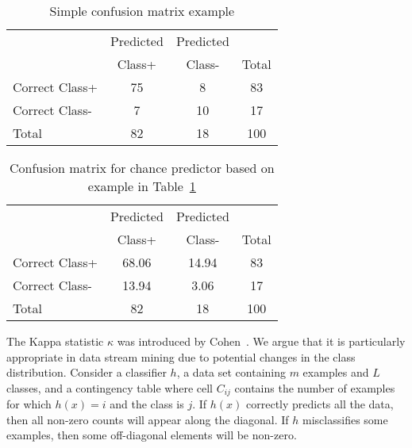 
\begin{table}[t]
 \begin{center} 
\begin{tabular}{lccc} \cline{2-4}
& Predicted & Predicted & \\
&  Class+&  Class-&Total\\ \hline
Correct Class+ &75&	8&	83 \\
Correct Class-&7&	10&	17 \\ \hline
Total &82&	18&	100 \\
\end{tabular}
\end{center}
\caption{Simple confusion matrix example}
\label{tab:kappa}
\end{table} 

\begin{table}[t]
 \begin{center} 
\begin{tabular}{lccc} \cline{2-4}
& Predicted & Predicted & \\
&  Class+&  Class-&Total\\ \hline
Correct Class+ &68.06&	14.94&	83 \\
Correct Class-&13.94&	3.06&	17\\ \hline
Total &82&	18&	100 \\
\end{tabular}
\end{center}
\caption{Confusion matrix for chance predictor based on example in
Table~\ref{tab:kappa}}
\label{tab:kappa2}
\end{table} 

The Kappa statistic $\kappa$ was introduced by Cohen~\cite{cohen}.  We
argue that it is particularly appropriate in data stream mining due to
potential changes in the class distribution.  Consider a classifier
$h$, a data set containing $m$ examples and $L$ classes, and a contingency table where
cell $C_{ij}$ contains the number of examples for which $h(x)=i$ and
the class is $j$.  If $h(x)$ correctly predicts all the data, then all
non-zero counts will appear along the diagonal. If $h$ misclassifies
some examples, then some off-diagonal elements will be non-zero.

